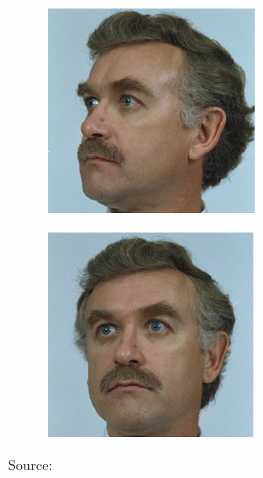\documentclass[xetex,aspectratio=169,xcolor,professionalfonts,hyperref]{beamer}
\begin{document}
\begin{frame}
{{\begin{figure}[hb]
\begin{subfigure}[b]{0.24\columnwidth}
        \end{subfigure}
        \hfill
        \begin{subfigure}[b]{0.24\columnwidth}
            \centering
            \includegraphics[width=\columnwidth]{figures/face3.png}
        \end{subfigure}
        \hfill
        \begin{subfigure}[b]{0.24\columnwidth}
            \centering
            \includegraphics[width=\columnwidth]{figures/face4.png}
        \end{subfigure}
        \caption{Source: \cite{faces}}
        \label{fig:rotation}
    \end{figure}
    }}


\end{frame}
\end{document}
